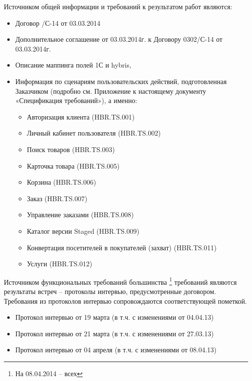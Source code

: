 
Источником общей информации и требований к результатом работ являются:
\begin{itemize}
\item Договор /С-14 от 03.03.2014
\item Дополнительное соглашение  от 03.03.2014г. к Договору 0302/С-14 от 03.03.2014г.
\item Описание маппинга полей 1С и hybris,
\item Информация по сценариям пользовательских действий, подготовленная Заказчиком (подробно см. Приложение  
к настоящему документу «Спецификация требований»), а именно:
\begin{itemize} 
 \item Авторизация клиента (HBR.TS.001)
 \item Личный кабинет пользователя (HBR.TS.002) 
 \item Поиск товаров (HBR.TS.003) 
 \item Карточка товара (HBR.TS.005)
 \item Корзина (HBR.TS.006)
 \item Заказ (HBR.TS.007) 
 \item Управление заказами (HBR.TS.008)
 \ifcand
	\item Каталог версии Staged (HBR.TS.009) 
	\item Конвертация посетителей в покупателей  (захват) (HBR.TS.011)
 	\item Услуги (HBR.TS.012) 
 \fi
\end{itemize}
\end{itemize}

Источником функциональных требований большинства \footnote{На 08.04.2014 -- всех} требований являются результаты встреч -- протоколы интервью, предусмотренные договором. Требования из протоколов интервью сопровождаются соответствующей пометкой. 

\begin{itemize}
\item Протокол интервью от 19 марта (в т.ч. с изменениями от 04.04.13)
\item Протокол интервью от 21 марта (в т.ч. с изменениями от 27.03.13)
\item Протокол интервью от 04 апреля (в т.ч. с изменениями от 08.04.13)
\end{itemize}


